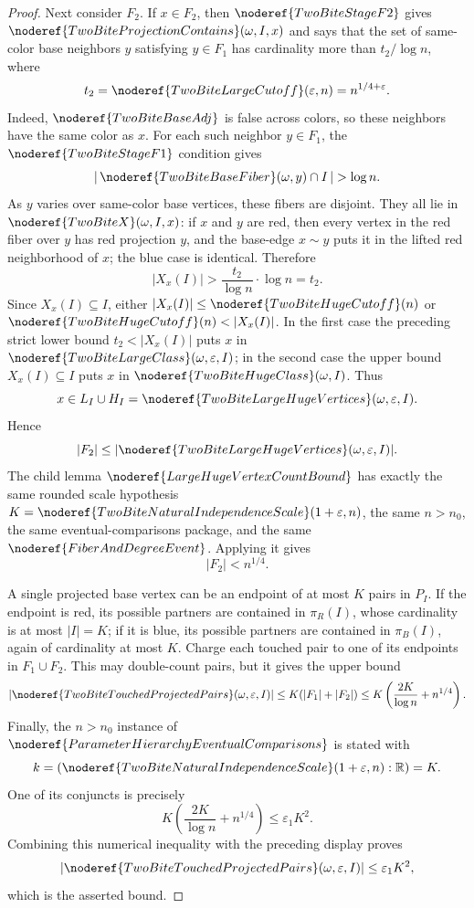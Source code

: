 \begin{proof}
Next consider \(F_2\).  If \(x\in F_2\), then
\(\noderef{TwoBiteStageF2}\) gives
\(\noderef{TwoBiteProjectionContains}(\omega,I,x)\) and says that the set of
same-color base neighbors \(y\) satisfying \(y\in F_1\) has cardinality more
than \(t_2/\log n\), where
\[
t_2=\noderef{TwoBiteLargeCutoff}(\varepsilon,n)=n^{1/4+\varepsilon}.
\]
Indeed, \(\noderef{TwoBiteBaseAdj}\) is false across colors, so these neighbors
have the same color as \(x\).  For each such neighbor \(y\in F_1\), the
\(\noderef{TwoBiteStageF1}\) condition gives
\[
|\,\noderef{TwoBiteBaseFiber}(\omega,y)\cap I\,|>\log n.
\]
As \(y\) varies over same-color base vertices, these fibers are disjoint.  They
all lie in \(\noderef{TwoBiteX}(\omega,I,x)\): if \(x\) and \(y\) are red, then
every vertex in the red fiber over \(y\) has red projection \(y\), and the
base-edge \(x\sim y\) puts it in the lifted red neighborhood of \(x\); the blue
case is identical.  Therefore
\[
|X_x(I)|> \frac{t_2}{\log n}\cdot \log n=t_2.
\]
Since \(X_x(I)\subseteq I\), either
\(|X_x(I)|\le\noderef{TwoBiteHugeCutoff}(n)\) or
\(\noderef{TwoBiteHugeCutoff}(n)<|X_x(I)|\).  In the first case the preceding
strict lower bound \(t_2<|X_x(I)|\) puts \(x\) in
\(\noderef{TwoBiteLargeClass}(\omega,\varepsilon,I)\); in the second case the
upper bound \(X_x(I)\subseteq I\) puts \(x\) in
\(\noderef{TwoBiteHugeClass}(\omega,I)\).  Thus
\[
x\in L_I\cup H_I=\noderef{TwoBiteLargeHugeVertices}(\omega,\varepsilon,I).
\]
Hence
\[
|F_2|\le |\noderef{TwoBiteLargeHugeVertices}(\omega,\varepsilon,I)|.
\]
The child lemma \(\noderef{LargeHugeVertexCountBound}\) has exactly the same
rounded scale hypothesis \(K=\noderef{TwoBiteNaturalIndependenceScale}
(1+\varepsilon,n)\), the same \(n>n_0\), the same eventual-comparisons package,
and the same \(\noderef{FiberAndDegreeEvent}\).  Applying it gives
\[
|F_2|<n^{1/4}.
\]

A single projected base vertex can be an endpoint of at most \(K\) pairs in
\(P_I\).  If the endpoint is red, its possible partners are contained in
\(\pi_R(I)\), whose cardinality is at most \(|I|=K\); if it is blue, its possible
partners are contained in \(\pi_B(I)\), again of cardinality at most \(K\).
Charge each touched pair to one of its endpoints in \(F_1\cup F_2\).  This may
double-count pairs, but it gives the upper bound
\[
|\noderef{TwoBiteTouchedProjectedPairs}(\omega,\varepsilon,I)|
\le K(|F_1|+|F_2|)
\le K\left(\frac{2K}{\log n}+n^{1/4}\right).
\]
Finally, the \(n>n_0\) instance of
\(\noderef{ParameterHierarchyEventualComparisons}\) is stated with
\[
k=(\noderef{TwoBiteNaturalIndependenceScale}(1+\varepsilon,n):\mathbb R)=K.
\]
One of its conjuncts is precisely
\[
K\left(\frac{2K}{\log n}+n^{1/4}\right)\le\varepsilon_1K^2.
\]
Combining this numerical inequality with the preceding display proves
\[
|\noderef{TwoBiteTouchedProjectedPairs}(\omega,\varepsilon,I)|
\le \varepsilon_1K^2,
\]
which is the asserted bound.
\end{proof}
